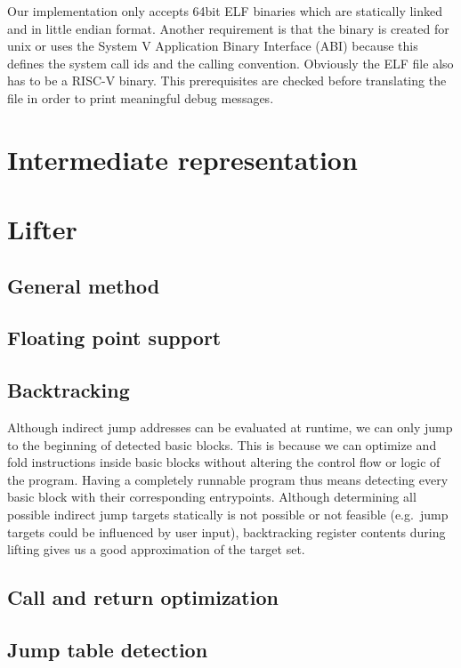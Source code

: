 \documentclass[course=eragp]{aspdoc}
\begin{document}
\par

Our implementation only accepts 64bit ELF binaries which are statically linked and in little endian
format. Another requirement is that the binary is created for unix or uses the System V Application
Binary Interface (ABI) because this defines the system call ids and the calling convention.
Obviously the ELF file also has to be a RISC-V binary. This prerequisites are checked before
translating the file in order to print meaningful debug messages.

\section{Intermediate representation}

\section{Lifter}
\subsection{General method}
\subsection{Floating point support}
\subsection{Backtracking}
Although indirect jump addresses can be evaluated at runtime, we can only jump to the beginning of
detected basic blocks. This is because we can optimize  and fold
instructions  inside basic blocks without altering the control flow or
logic of the program. Having a completely runnable program thus means detecting every basic block
with their corresponding entrypoints. Although determining all possible indirect jump targets
statically is not possible or not feasible (e.g.\ jump targets could be influenced by user input),
backtracking register contents during lifting gives us a good approximation of the target set.

\subsection{Call and return optimization}
\subsection{Jump table detection}
\end{document}
